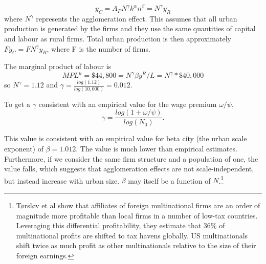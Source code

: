 \documentclass[]{article}
\begin{document}
\[y_C=A_F N^\gamma k^\alpha n^\beta = N^\gamma y_R\]
where $N^\gamma$ represents the agglomeration effect. This assumes that all urban production is generated by the firms and they use the same quantities of capital and labour as rural firms. Total urban production is then approximately $Fy_C=FN^\gamma y_R $, where F is the number of firms.

The marginal product of labour is 
\[MPL^u=\$44,800=N^\gamma \beta y^R/L=N^\gamma *\$40,000\]
so $N^\gamma= 1.12$ and $\gamma = \frac{log(1.12)}{log(10,000)} =  0.012$. 


To get a  $\gamma$  consistent with an empirical  value for  the wage premium  $\omega / \psi$, 
\begin{equation}
\gamma= \frac{log(1+\omega/\psi)}{log(N_0)}.\label{eqn:gamma-define}
\end{equation}


This value is consistent with an empirical  value for beta city (the urban scale exponent) of $\beta =  1.012$. The value is much lower than empirical estimates. Furthermore, if we consider the same firm structure and a population of one, the value falls, which suggests that agglomeration effects are not scale-independent, but instead increase with urban size. $\beta$ may itself be a function of $N$.\footnote{Tørsløv et al \cite{torslovMissingProfitsNations2023} show that affiliates of foreign multinational firms are an order of magnitude more profitable than local firms in a number of low-tax countries. Leveraging this differential profitability, they estimate that 36\% of multinational profits are shifted to tax havens globally. US multinationals shift twice as much profit as other multinationals relative to the size of their foreign earnings.}










\end{document}
